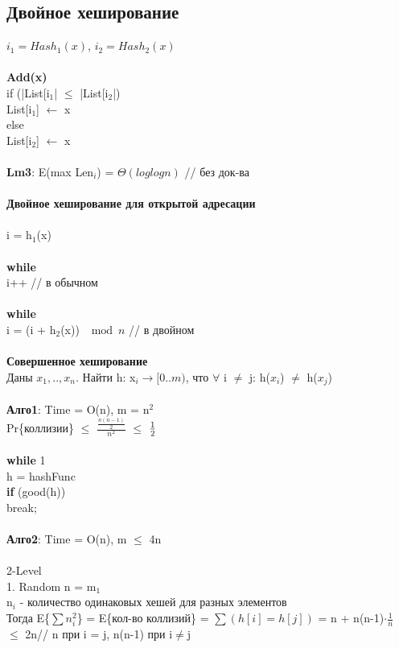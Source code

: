\subsection{Двойное хеширование}
$i_1 = Hash_1(x)$, $i_2 = Hash_2(x)$\\\\
\textbf{Add(x)}\\
if (|List[i$_1$| $\le$ |List[i$_2$|) \\
List[i$_1$] $\leftarrow$ x 	\\
else\\
List[i$_2$] $\leftarrow$ x \\\\
\textbf{Lm3}: E(max Len$_i$) = $\Theta(log log n)$ 	// без док-ва \\\\
\textbf{Двойное хеширование для открытой адресации}\\\\
i = h$_1$(x)\\\\
\textbf{while}\\
i++  // в обычном \\\\
\textbf{while}\\
i = (i + h$_2$(x)) $\mod n$ // в двойном\\\\
\textbf{Совершенное хеширование} \\
Даны $x_1,..,x_n$. Найти h: x$_i\rightarrow [0..m)$, что  $\forall$ i $\neq$ j: h($x_i$) $\neq$ h($x_j$)\\\\
\textbf{Алго1}: Time = O(n), m = n$^2$\\
Pr\{коллизии\} $\le$ $\frac{\frac{n(n-1)}{2}}{n^2}$ $\le$ $1\over{2}$\\\\
\textbf{while} 1\\
h = hashFunc\\
\textbf{if} (good(h))\\
break;\\\\
\textbf{Алго2}: Time  = O(n), m $\le$ 4n\\\\
2-Level\\
1. Random n = m$_1$\\
n$_i$ - количество одинаковых хешей для разных элементов\\
Тогда E\{$\sum n_i^2$\} = E\{кол-во коллизий\} = $\sum(h[i] = h[j])$ = n + n(n-1)$\cdot \frac{1}{n}$ $\le$ 2n// n при i = j, n(n-1) при i$\neq$j \\\\
